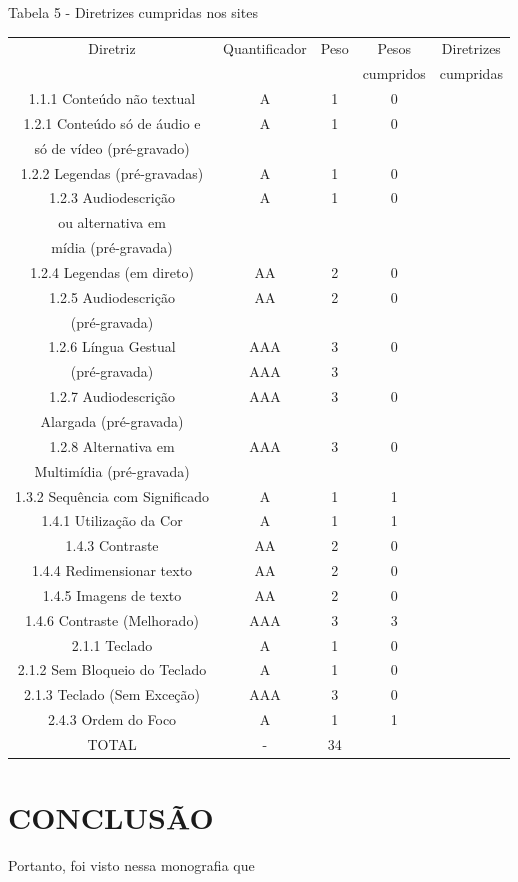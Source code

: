 \documentclass[a4paper]{article}
\begin{document}
\begin{titlepage}
Tabela 5 - Diretrizes cumpridas nos sites\\[-1cm]
\begin{center}
	\begin{longtable}{|c|c|c|c|c|}
		\hline
		Diretriz & Quantificador & Peso & Pesos & Diretrizes\\
		& & & cumpridos & cumpridas\\
		\hline
		1.1.1 Conteúdo não textual & A & 1 & 0 & \\
		\hline
		1.2.1 Conteúdo só de áudio e & A & 1 & 0 & \\
		só de vídeo (pré-gravado) & & & & \\
		\hline
		1.2.2 Legendas (pré-gravadas) & A & 1 & 0 & \\
		\hline
		1.2.3 Audiodescrição & A & 1 & 0 & \\
		ou alternativa em & & & & \\
		mídia (pré-gravada) & & & & \\
		\hline
		1.2.4 Legendas (em direto) & AA & 2 & 0 & \\
		\hline
		1.2.5 Audiodescrição & AA & 2 & 0 & \\
		(pré-gravada) & & & & \\
		\hline
		1.2.6 Língua Gestual & AAA & 3 & 0 & \\
		(pré-gravada) & AAA & 3 & & \\
		\hline
		1.2.7 Audiodescrição & AAA & 3 & 0 & \\
		Alargada (pré-gravada) & & & & \\
		\hline
		1.2.8 Alternativa em & AAA & 3 & 0 & \\
		Multimídia (pré-gravada) & & & & \\
		\hline
		1.3.2 Sequência com Significado & A & 1 & 1 & \\
		\hline
		1.4.1 Utilização da Cor & A & 1 & 1 &  \\
		\hline
		1.4.3 Contraste & AA & 2 & 0 & \\
		\hline
		1.4.4 Redimensionar texto & AA & 2 & 0 & \\
		\hline
		1.4.5 Imagens de texto & AA & 2 & 0 & \\
		\hline
		1.4.6 Contraste (Melhorado) & AAA & 3 & 3 & \\
		\hline
		2.1.1 Teclado & A & 1 & 0 & \\
		\hline
		2.1.2 Sem Bloqueio do Teclado & A & 1 & 0 & \\
		\hline
		2.1.3 Teclado (Sem Exceção) & AAA & 3 & 0 & \\
		\hline
		2.4.3 Ordem do Foco & A & 1 & 1 & \\
		\hline
		TOTAL & - & 34 &  & \\
		\hline
	\end{longtable}
\end{center}

\section{CONCLUSÃO}

Portanto, foi visto nessa monografia que 
\end{titlepage}
\end{document}
